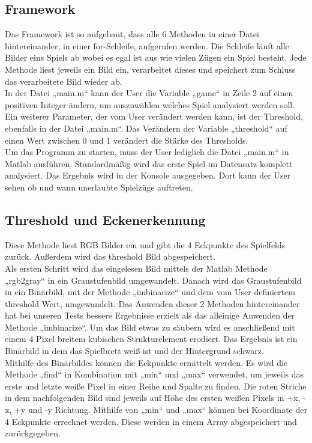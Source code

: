 \documentclass[paper=A4, deutsch]{scrartcl}
\begin{document}
\subsection{Framework}
Das Framework ist so aufgebaut, dass alle 6 Methoden in einer Datei hintereinander, in einer for-Schleife, aufgerufen werden. Die Schleife läuft alle Bilder eins Spiels ab wobei es egal ist aus wie vielen Zügen ein Spiel besteht. Jede Methode liest jeweils ein Bild ein, verarbeitet dieses und speichert zum Schluss das verarbeitete Bild wieder ab.\\
In der Datei „main.m“ kann der User die Variable „game“ in Zeile 2 auf einen positiven Integer ändern, um auszuwählen welches Spiel analysiert werden soll. Ein weiterer Parameter, der vom User verändert werden kann, ist der Threshold, ebenfalls in der Datei „main.m“. Das Verändern der  Variable „threshold“ auf einen Wert zwischen 0 und 1 verändert die Stärke des Thresholds.\\
Um das Programm zu starten, muss der User lediglich die Datei „main.m“ in Matlab ausführen. Standardmäßig wird das erste Spiel im Datensatz komplett analysiert. Das Ergebnis wird in der Konsole ausgegeben. Dort kann der User sehen ob und wann unerlaubte Spielzüge auftreten.\\

\subsection{Threshold und Eckenerkennung}
Diese Methode liest RGB Bilder ein und gibt die 4 Eckpunkte des Spielfelds zurück. Außerdem wird das threshold Bild abgespeichert.\\
Als ersten Schritt wird das eingelesen Bild mittels der Matlab Methode „rgb2gray“ in ein Graustufenbild umgewandelt. Danach wird das Graustufenbild in ein Binärbild, mit der Methode „imbinarize“ und dem vom User definiertem threshold Wert, umgewandelt. Das Anwenden dieser 2 Methoden hintereinander hat bei unseren Tests bessere Ergebnisse erzielt als das alleinige Anwenden der Methode „imbinarize“. Um das Bild etwas zu säubern wird es anschließend mit einem  4 Pixel breitem kubischen Strukturelement erodiert. Das Ergebnis ist ein Binärbild in dem das Spielbrett weiß ist und der Hintergrund schwarz.\\
Mithilfe des Binärbildes können die Eckpunkte ermittelt werden. Es wird die Methode „find“ in Kombination mit „min“ und „max“ verwendet, um jeweils das erste und letzte weiße Pixel in einer Reihe und Spalte zu finden. Die roten Striche in dem nachfolgenden Bild sind jeweils auf Höhe des ersten weißen Pixels in +x, -x, +y und -y Richtung. Mithilfe von „min“ und „max“ können bei Koordinate der 4 Eckpunkte errechnet werden. Diese werden in einem Array abgespeichert und zurückgegeben.\\
\end{document}
